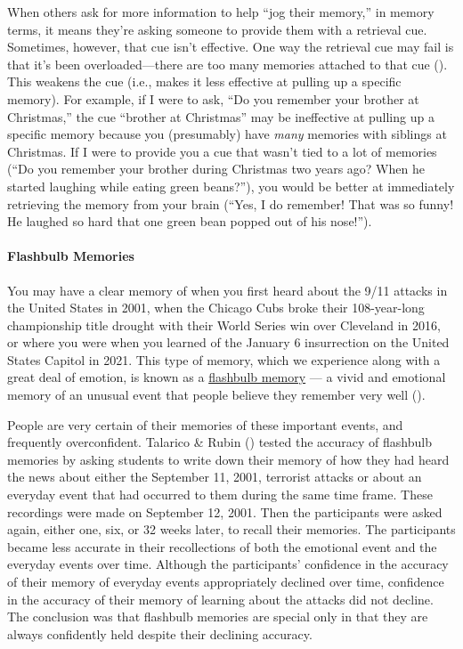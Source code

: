 \documentclass[
]{krantz}
\begin{document}
When others ask for more information to help ``jog their memory,'' in memory terms, it means they're asking someone to provide them with a retrieval cue. Sometimes, however, that cue isn't effective. One way the retrieval cue may fail is that it's been overloaded---there are too many memories attached to that cue (). This weakens the cue (i.e., makes it less effective at pulling up a specific memory). For example, if I were to ask, ``Do you remember your brother at Christmas,'' the cue ``brother at Christmas'' may be ineffective at pulling up a specific memory because you (presumably) have \emph{many} memories with siblings at Christmas. If I were to provide you a cue that wasn't tied to a lot of memories (``Do you remember your brother during Christmas two years ago? When he started laughing while eating green beans?''), you would be better at immediately retrieving the memory from your brain (``Yes, I do remember! That was so funny! He laughed so hard that one green bean popped out of his nose!'').

\paragraph*{Flashbulb Memories}\label{flashbulb-memories}

You may have a clear memory of when you first heard about the 9/11 attacks in the United States in 2001, when the Chicago Cubs broke their 108-year-long championship title drought with their World Series win over Cleveland in 2016, or where you were when you learned of the January 6 insurrection on the United States Capitol in 2021. This type of memory, which we experience along with a great deal of emotion, is known as a \hyperref[flashbulb-memory]{flashbulb memory} --- a vivid and emotional memory of an unusual event that people believe they remember very well ().

People are very certain of their memories of these important events, and frequently overconfident. Talarico \& Rubin () tested the accuracy of flashbulb memories by asking students to write down their memory of how they had heard the news about either the September 11, 2001, terrorist attacks or about an everyday event that had occurred to them during the same time frame. These recordings were made on September 12, 2001. Then the participants were asked again, either one, six, or 32 weeks later, to recall their memories. The participants became less accurate in their recollections of both the emotional event and the everyday events over time. Although the participants' confidence in the accuracy of their memory of everyday events appropriately declined over time, confidence in the accuracy of their memory of learning about the attacks did not decline. The conclusion was that flashbulb memories are special only in that they are always confidently held despite their declining accuracy.
\end{document}
